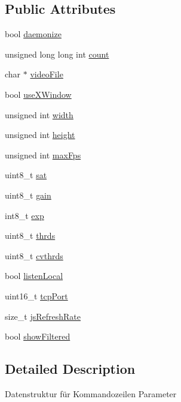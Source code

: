 \subsection*{Public Attributes}
\begin{DoxyCompactItemize}
\item 
bool \hyperlink{structcmd__opts_a0e94dcdbf5c755d97477c346ece96a2e}{daemonize}
\item 
unsigned long long int \hyperlink{structcmd__opts_a582f29b5e8c3328779e88bcb22ff3c2e}{count}
\item 
char $\ast$ \hyperlink{structcmd__opts_acee5a1c6793898bbda38d6d7fb5de431}{video\+File}
\item 
bool \hyperlink{structcmd__opts_aee44e8161de659e8fff50e09100f9ada}{use\+X\+Window}
\item 
unsigned int \hyperlink{structcmd__opts_a0f13b6290e7e33c22a258c11ed23f72f}{width}
\item 
unsigned int \hyperlink{structcmd__opts_a0ab9c9cf886559f8cf19dd2f7be072fb}{height}
\item 
unsigned int \hyperlink{structcmd__opts_a2b42f4e7bd954f5ac87c82e9d19a9b84}{max\+Fps}
\item 
uint8\+\_\+t \hyperlink{structcmd__opts_aa83f2910f6a1803ee8c9f9e3581db314}{sat}
\item 
uint8\+\_\+t \hyperlink{structcmd__opts_a55323cae5dfbafe672e6581da99985b9}{gain}
\item 
int8\+\_\+t \hyperlink{structcmd__opts_aa6ef1ebf0fbaa8bd7016a8ef1a2c5ef4}{exp}
\item 
uint8\+\_\+t \hyperlink{structcmd__opts_a7518cdbdbc6ed1b8cc404aa675f383a6}{thrds}
\item 
uint8\+\_\+t \hyperlink{structcmd__opts_a6d2fcb749257ff950fabdb000999d7f9}{cvthrds}
\item 
bool \hyperlink{structcmd__opts_a9d2405b56bef96f631ac27a4d3ff3cb4}{listen\+Local}
\item 
uint16\+\_\+t \hyperlink{structcmd__opts_a2f37e990a3592777d92c156548422150}{tcp\+Port}
\item 
size\+\_\+t \hyperlink{structcmd__opts_af3bc7afbf82fe94305a11352c584fb6e}{js\+Refresh\+Rate}
\item 
bool \hyperlink{structcmd__opts_ab2a0a976837dc40909f765546c60c4c9}{show\+Filtered}
\end{DoxyCompactItemize}


\subsection{Detailed Description}
Datenstruktur für Kommandozeilen Parameter 

